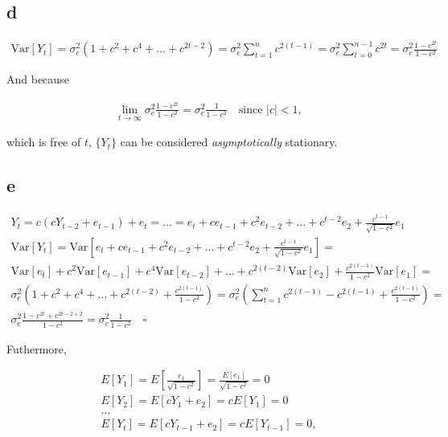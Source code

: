 \documentclass[]{book}
\begin{document}
\subsection*{d}\label{d-1}

\begin{gather*}
  \text{Var}[Y_t] = \sigma_e^2(1+c^2+c^4+\dots+c^{2t-2}) = \sigma_e^2\sum_{t=1}^{n}c^{2(t-1)}=\sigma_e^2 \sum_{t=0}^{n-1} c^{2t} =
    \sigma_e^2 \frac{1-c^{2t}}{1-c^2}
\end{gather*}

And because

\begin{gather*}
\lim_{t \rightarrow \infty} \sigma_e^2 \frac{1-c^{2t}}{1-c^2} = \sigma_e^2 \frac{1}{1-c^2}\quad\text{since }|c| < 1,
\end{gather*}

which is free of \(t\), \(\{Y_t\}\) can be considered
\emph{asymptotically} stationary.

\subsection*{e}\label{e}

\begin{gather*}
  Y_t = c(cY_{t-2} + e_{t-1}) + e_t = \dots = e_t+ce_{t-1} + c^2e_{t-2} + \dots + c^{t-2}e_2+ \frac{c^{t-1}}{\sqrt{1-c^2}}e_1\\
  \text{Var}[Y_t] = \text{Var}[e_t+ce_{t-1}+c^2e_{t-2}+\dots+c^{t-2}e_2+\frac{c^{t-1}}{\sqrt{1-c^2}}e_1] =\\
  \text{Var}[e_t] + c^2\text{Var}[e_{t-1}]+c^4 \text{Var}[e_{t-2}] + \dots + c^{2(t-2)}\text{Var}[e_2]+\frac{c^{2(t-1)}}{1-c^2}\text{Var}[e_1] =\\
  \sigma_e^2(1 + c^2 + c^4 + \dots + c^{2(t-2)} + \frac{c^{2(t-1)}}{1-c^2}) =\sigma_e^2\left( \sum_{t=1}^{n}c^{2(t-1)} - c^{2(t-1)} + \frac{c^{2(t-1)}}{1-c^2}\right)= \\
  \sigma_e^2 \frac{1-c^{2t}+c^{2t-2+2}}{1-c^2} = \sigma_e^2 \frac{1}{1-c^2} \quad \square
\end{gather*}

Futhermore,

\begin{gather*}
  E[Y_1] = E\left[\frac{e_1}{\sqrt{1-c^2}}\right] = \frac{E[e_1]}{\sqrt{1-c^2}} = 0\\
  E[Y_2] = E[cY_{1} + e_2] = cE[Y_{1}] = 0\\
  \dots \\
  E[Y_t] = E[cY_{t-1} + e_2] = cE[Y_{t-1}] = 0,\\
\end{gather*}
\end{document}

